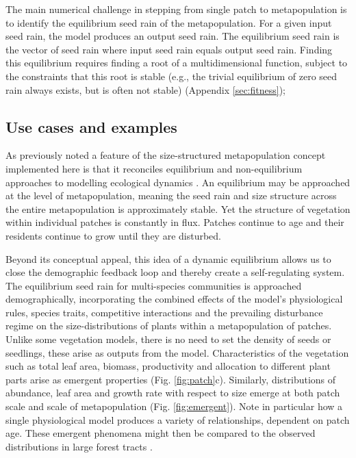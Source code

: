 \documentclass[a4paper,11pt]{article}
\begin{document}
The main numerical challenge in stepping from single patch
to metapopulation is to identify the equilibrium seed rain of the
metapopulation. For a given input seed rain, the model produces an
output seed rain. The equilibrium seed rain is the vector of seed rain
where input seed rain equals output seed rain. Finding this equilibrium
requires finding a root of a multidimensional function, subject to the
constraints that this root is stable (e.g., the trivial equilibrium of
zero seed rain always exists, but is often not stable) (Appendix \ref{sec:fitness});

\subsection{Use cases and examples}

As previously noted \citep{Kohyama-1993, Moorcroft-2001, Falster-2011} a
feature of the size-structured metapopulation concept implemented here
is that it reconciles equilibrium and non-equilibrium approaches to
modelling ecological dynamics
\citep{Levin-1974, Bormann-1979, Connell-1978, Coomes-2007}. An
equilibrium may be approached at the level of metapopulation, meaning
the seed rain and size structure across the entire metapopulation is
approximately stable. Yet the structure of vegetation within individual
patches is constantly in flux. Patches continue to age and their
residents continue to grow until they are disturbed.

Beyond its conceptual appeal, this idea of a dynamic equilibrium allows
us to close the demographic feedback loop and thereby create a
self-regulating system. The equilibrium seed rain for multi-species
communities is approached demographically, incorporating the combined
effects of the model's physiological rules, species traits, competitive
interactions and the prevailing disturbance regime on the
size-distributions of plants within a metapopulation of patches. Unlike
some vegetation models, there is no need to set the density of seeds or
seedlings, these arise as outputs from the model. Characteristics of the
vegetation such as total leaf area, biomass, productivity and allocation
to different plant parts arise as emergent properties (Fig.
\ref{fig:patch}c). Similarly, distributions of abundance, leaf area and
growth rate with respect to size emerge at both patch scale and scale of
metapopulation (Fig. \ref{fig:emergent}). Note in particular how a single
physiological model produces a variety of relationships, dependent on patch
age. These emergent phenomena might then be compared to the observed
distributions in large forest tracts \citep{Muller-2006}.
\end{document}
